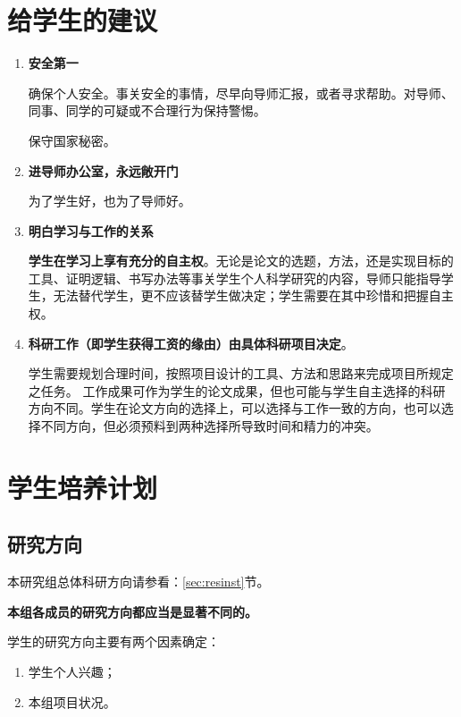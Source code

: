 \documentclass[
]{ctexbook}
\providecommand{\tightlist}{%
  \setlength{\itemsep}{0pt}\setlength{\parskip}{0pt}}
\begin{document}
\hypertarget{ux7ed9ux5b66ux751fux7684ux5efaux8bae}{%
\section{给学生的建议}\label{ux7ed9ux5b66ux751fux7684ux5efaux8bae}}

\begin{enumerate}
\def\labelenumi{\arabic{enumi}.}
\item
  \textbf{安全第一}

  确保个人安全。事关安全的事情，尽早向导师汇报，或者寻求帮助。对导师、同事、同学的可疑或不合理行为保持警惕。

  保守国家秘密。
\item
  \textbf{进导师办公室，永远敞开门}

  为了学生好，也为了导师好。
\item
  \textbf{明白学习与工作的关系}

  \textbf{学生在学习上享有充分的自主权}。无论是论文的选题，方法，还是实现目标的工具、证明逻辑、书写办法等事关学生个人科学研究的内容，导师只能指导学生，无法替代学生，更不应该替学生做决定；学生需要在其中珍惜和把握自主权。
\item
  \textbf{科研工作（即学生获得工资的缘由）由具体科研项目决定}。

  学生需要规划合理时间，按照项目设计的工具、方法和思路来完成项目所规定之任务。
  工作成果可作为学生的论文成果，但也可能与学生自主选择的科研方向不同。学生在论文方向的选择上，可以选择与工作一致的方向，也可以选择不同方向，但必须预料到两种选择所导致时间和精力的冲突。
\end{enumerate}

\hypertarget{ux5b66ux751fux57f9ux517bux8ba1ux5212}{%
\section{学生培养计划}\label{ux5b66ux751fux57f9ux517bux8ba1ux5212}}

\hypertarget{ux7814ux7a76ux65b9ux5411}{%
\subsection{研究方向}\label{ux7814ux7a76ux65b9ux5411}}

本研究组总体科研方向请参看：\ref{sec:resinst}节。

\textbf{本组各成员的研究方向都应当是显著不同的。}

学生的研究方向主要有两个因素确定：

\begin{enumerate}
\def\labelenumi{\arabic{enumi}.}
\tightlist
\item
  学生个人兴趣；
\item
  本组项目状况。
\end{enumerate}
\end{document}
